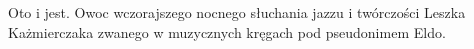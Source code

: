 \documentclass[../MAIN.tex]{subfiles}
\begin{document}
Oto i jest. Owoc wczorajszego nocnego słuchania jazzu i
twórczości Leszka Każmierczaka zwanego w muzycznych kręgach pod
pseudonimem Eldo.
\end{document}
